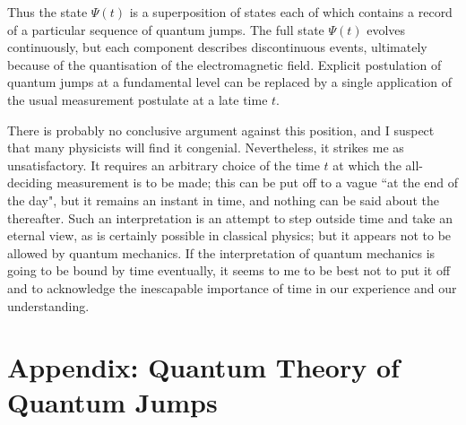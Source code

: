 \documentclass[12pt,a4paper,reqno]{article}
\renewcommand{\(}{\left(}
\renewcommand{\)}{\right)}
\newcommand{\<}{\langle}
\renewcommand{\>}{\rangle}
\theoremstyle{plain} %
\theoremstyle{definition}
\theoremstyle{remark}
\begin{document}
Thus the state $\Psi(t)$ is a superposition of states each of which
contains a record of a particular sequence of quantum jumps. The full
state $\Psi(t)$ evolves continuously, but each component describes
discontinuous events, ultimately because of the quantisation of the
electromagnetic field. Explicit postulation of quantum jumps at a
fundamental level can be replaced by a single application of the usual
measurement postulate at a late time $t$.

There is probably no conclusive argument against this position,
and I suspect that many physicists will find it congenial. Nevertheless,
it strikes me as unsatisfactory. It requires an arbitrary choice of the time $t$
at which the all-deciding measurement is to be made; this can be put off
to a vague ``at the end of the day", but it remains an instant in time,
and nothing can be said about the thereafter. Such an interpretation is
an attempt to step outside time and take an eternal view, as is
certainly possible in classical physics; but it appears not to be
allowed by quantum mechanics. If the interpretation of quantum mechanics is going to
be bound by time eventually, it seems to me to be best not to put it off
and to acknowledge the inescapable importance of time in our experience
and our understanding.  

\newpage
\section*{}
\section*{Appendix: Quantum Theory of Quantum Jumps}
\end{document}

